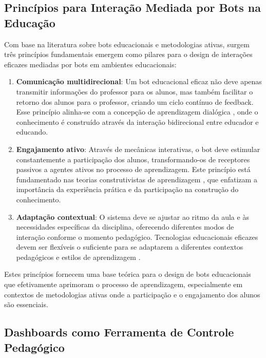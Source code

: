 \subsection{Princípios para Interação Mediada por Bots na Educação}
\label{subsec:principios}

Com base na literatura sobre bots educacionais e metodologias ativas, surgem três princípios fundamentais emergem como pilares para o design de interações eficazes mediadas por bots em ambientes educacionais:

\begin{enumerate}
\item \textbf{Comunicação multidirecional}: Um bot educacional eficaz não deve apenas transmitir informações do professor para os alunos, mas também facilitar o retorno dos alunos para o professor, criando um ciclo contínuo de feedback. Esse princípio alinha-se com a concepção de aprendizagem dialógica \cite{calvo2013}, onde o conhecimento é construído através da interação bidirecional entre educador e educando.
\item \textbf{Engajamento ativo}: Através de mecânicas interativas, o bot deve estimular constantemente a participação dos alunos, transformando-os de receptores passivos a agentes ativos no processo de aprendizagem. Este princípio está fundamentado nas teorias construtivistas de aprendizagem \cite{piaget1970}, que enfatizam a importância da experiência prática e da participação na construção do conhecimento.
\item \textbf{Adaptação contextual}: O sistema deve se ajustar ao ritmo da aula e às necessidades específicas da disciplina, oferecendo diferentes modos de interação conforme o momento pedagógico. Tecnologias educacionais eficazes devem ser flexíveis o suficiente para se adaptarem a diferentes contextos pedagógicos e estilos de aprendizagem \cite{winkler2018}.
\end{enumerate}

Estes princípios fornecem uma base teórica para o design de bots educacionais que efetivamente aprimoram o processo de aprendizagem, especialmente em contextos de metodologias ativas onde a participação e o engajamento dos alunos são essenciais.


\subsection{Dashboards como Ferramenta de Controle Pedagógico}
\label{subsec:dashboards}

